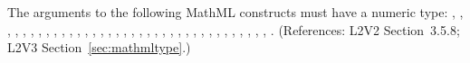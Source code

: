 The arguments to the following MathML constructs must have a numeric type:
, , , , ,
, , , , ,
, , , ,
, , , , ,
, , , , ,
, , , ,
, , , ,
, , , ,
.  (References: L2V2 Section~3.5.8;
L2V3 Section~\ref{sec:mathmltype}.)
